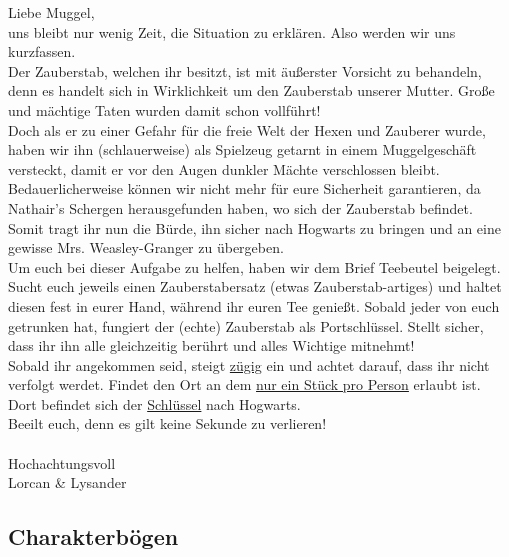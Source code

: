 \documentclass[]{scrartcl}
\begin{document}
{\calligra \large
	
Liebe Muggel,\\

uns bleibt nur wenig Zeit, die Situation zu erklären. Also werden wir uns kurzfassen.\\

Der Zauberstab, welchen ihr besitzt, ist mit äußerster Vorsicht zu behandeln, denn es handelt sich in Wirklichkeit um den Zauberstab unserer Mutter. Große und mächtige Taten wurden damit schon vollführt!\\

Doch als er zu einer Gefahr für die freie Welt der Hexen und Zauberer wurde, haben wir ihn (schlauerweise) als Spielzeug getarnt in einem Muggelgeschäft versteckt, damit er vor den Augen dunkler Mächte verschlossen bleibt. Bedauerlicherweise können wir nicht mehr für eure Sicherheit garantieren, da Nathair’s Schergen herausgefunden haben, wo sich der Zauberstab befindet.\\

Somit tragt ihr nun die Bürde, ihn sicher nach Hogwarts zu bringen und an eine gewisse Mrs. Weasley-Granger zu übergeben.\\

Um euch bei dieser Aufgabe zu helfen, haben wir dem Brief Teebeutel beigelegt. Sucht euch jeweils einen Zauberstabersatz (etwas Zauberstab-artiges) und haltet diesen fest in eurer Hand, während ihr euren Tee genießt. Sobald jeder von euch getrunken hat, fungiert der (echte) Zauberstab als Portschlüssel. Stellt sicher, dass ihr ihn alle gleichzeitig berührt und alles Wichtige mitnehmt!\\

Sobald ihr angekommen seid, steigt \underline{zügig} ein und achtet darauf, dass ihr nicht verfolgt werdet. Findet den Ort an dem \underline{nur ein Stück pro Person} erlaubt ist. Dort befindet sich der \underline{Schlüssel} nach Hogwarts.\\

Beeilt euch, denn es gilt keine Sekunde zu verlieren!\\

~\\

Hochachtungsvoll\\
Lorcan \& Lysander
}

\newpage

\subsection{Charakterbögen}
\end{document}
